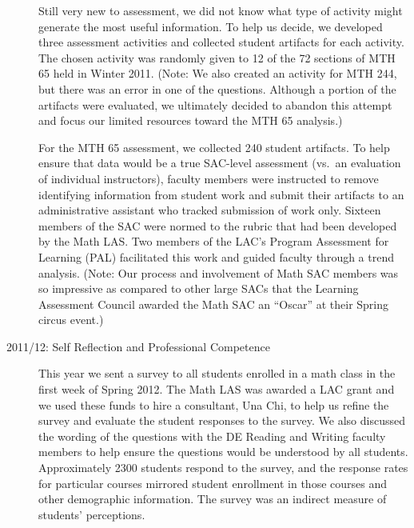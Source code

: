 \begin{description}
Still very new to assessment, we did not know what type of activity might
generate the most useful information.  To help us decide, we developed three
assessment activities and collected student artifacts for each activity.  The
chosen activity was randomly given to 12 of the 72 sections of MTH 65 held in
Winter 2011.  (Note: We also created an activity for MTH 244, but there was an
error in one of the questions.  Although a portion of the artifacts were
evaluated, we ultimately decided to abandon this attempt and focus our limited
resources toward the MTH 65 analysis.)

For the MTH 65 assessment, we collected 240 student artifacts.  To help ensure
that data would be a true SAC-level assessment (vs.\ an evaluation of individual
instructors), faculty members were instructed to remove identifying information
from student work and submit their artifacts to an administrative assistant who
tracked submission of work only.  Sixteen members of the SAC were normed to the
rubric that had been developed by the Math LAS.  Two members of the LAC's
Program Assessment for Learning (PAL) facilitated this work and guided faculty
through a trend analysis.  (Note: Our process and involvement of Math SAC
members was so impressive as compared to other large SACs that the Learning
Assessment Council awarded the Math SAC an ``Oscar'' at their Spring circus
event.)

\item[2011/12: Self Reflection and Professional Competence]

This year we sent a survey to all students enrolled in a math class in the first
week of Spring 2012.  The Math LAS was awarded a LAC grant and we used these
funds to hire a consultant, Una Chi, to help us refine the survey and evaluate
the student responses to the survey.  We also discussed the wording of the
questions with the DE Reading and Writing faculty members to help ensure the
questions would be understood by all students. Approximately 2300 students
respond to the survey, and the response rates for particular courses mirrored
student enrollment in those courses and other demographic information.  The
survey was an indirect measure of students' perceptions.  


\end{description}
